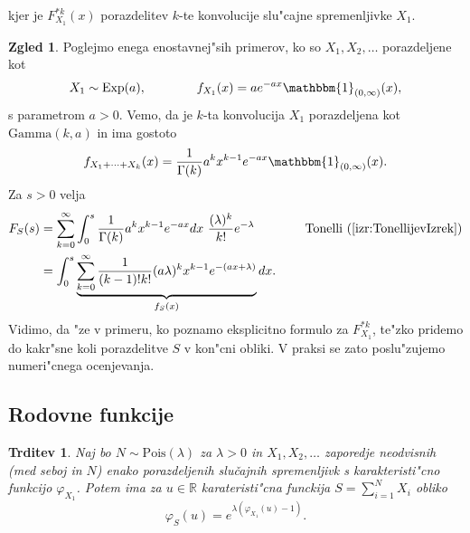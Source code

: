 \documentclass[12pt, a4paper, reqno]{amsart}
\theoremstyle{definition}
\newtheorem{zgled}[definicija]{Zgled}
\theoremstyle{plain}
\newtheorem{trditev}[definicija]{Trditev}
\newcommand{\R}{\mathbb{R}}
\newcommand{\1}{\mathds{1}}
\newcommand{\Pois}[1]{\text{Pois}(#1)}
\begin{document}
    \noindent
    kjer je $F_{X_1}^{*k}(x)$ porazdelitev $k$-te konvolucije slu"cajne spremenljivke $X_1$.
    
    \begin{zgled}
        Poglejmo enega enostavnej"sih primerov, ko so $X_1, X_2, \dots$ porazdeljene kot
        \begin{equation*}
            X_1\sim\text{Exp}(a), \qquad \qquad f_{X_1}(x) = a e^{-a x}\mathbbm{1}_{(0, \infty)}(x),
        \end{equation*}
        s parametrom $a>0$. Vemo, da je $k$-ta 
        konvolucija $X_1$ porazdeljena kot \newline $\text{Gamma}(k, a)$ in ima gostoto
        \begin{equation*}
            f_{X_1 + \cdots + X_k}(x) = \frac{1}{\Gamma(k)}a^kx^{k-1}e^{-a x}\mathbbm{1}_{(0, \infty)}(x).
        \end{equation*}
        Za $s>0$ velja
        \begin{align*}
            F_{S}(s) 
            &= \sum_{k=0}^\infty \int_0^s\frac{1}{\Gamma(k)}a^kx^{k-1}e^{-ax}dx \ \frac{(\lambda )^k}{k!}e^{-\lambda }
            \qquad \qquad \text{Tonelli} \ (\ref{izr:TonellijevIzrek}) \\
            &= \int_0^s\underbrace{\sum_{k=0}^\infty \frac{1}{(k-1)!k!}(a\lambda)^kx^{k-1}e^{-(ax + \lambda)}}_{f_S(x)}dx.
        \end{align*}
        Vidimo, da "ze v primeru, ko poznamo eksplicitno formulo za $F^{*k}_{X_1}$, te"zko pridemo do 
        kakr"sne koli porazdelitve $S$ v kon"cni obliki. V praksi se zato poslu"zujemo numeri"cnega 
        ocenjevanja.
        \label{zgd:sestavljenaPoissonovaPorazdelitevGamma}
    \end{zgled}

    \subsection{Rodovne funkcije}

    \begin{trditev}
        Naj bo $N\sim \Pois{\lambda}$  za $\lambda >0$ in $X_1, X_2, \dots$ zaporedje neodvisnih (med seboj in $N$)
        enako porazdeljenih slučajnih spremenljivk s karakteristi"cno funkcijo $\varphi_{X_1}$. Potem ima za $u\in\R$
        karateristi"cna funckija $S = \sum_{i=1}^NX_i$ obliko
        \begin{equation*}
            \varphi_{S}(u) = e^{\lambda \left(\varphi_{X_1}(u) - 1\right)}.
        \end{equation*}
        \label{trd:MomentGener}
    \end{trditev}
    
\end{document}
